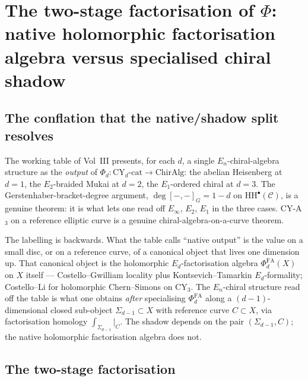 \section{The two-stage factorisation of $\Phi$: native holomorphic
factorisation algebra versus specialised chiral shadow}
\label{sec:two-stage-functor}

\subsection{The conflation that the native/shadow split resolves}

The working table of Vol~III presents, for each $d$, a single
$E_n$-chiral-algebra structure as the \emph{output} of
$\Phi_d: \mathrm{CY}_d\text{-cat}\to\mathrm{ChirAlg}$: the abelian
Heisenberg at $d=1$, the $E_2$-braided Mukai at $d=2$, the $E_1$-ordered
chiral at $d=3$. The Gerstenhaber-bracket-degree argument,
$\deg[-,-]_G = 1-d$ on $\mathrm{HH}^{\bullet}(\mathcal{C})$, is a genuine
theorem: it is what lets one read off $E_\infty$, $E_2$, $E_1$ in the
three cases. CY-A$_3$ on a reference elliptic curve is a genuine
chiral-algebra-on-a-curve theorem.

The labelling is backwards. What the table calls ``native output'' is
the value on a small disc, or on a reference curve, of a canonical
object that lives one dimension up. That canonical object is the
holomorphic $E_d$-factorisation algebra $\Phi^{\mathrm{FA}}_d(X)$ on
$X$ itself --- Costello--Gwilliam locality plus Kontsevich--Tamarkin
$E_d$-formality; Costello--Li for holomorphic Chern--Simons on CY$_3$.
The $E_n$-chiral structure read off the table is what one obtains
\emph{after} specialising $\Phi^{\mathrm{FA}}_d$ along a
$(d-1)$-dimensional closed sub-object $\Sigma_{d-1}\subset X$ with
reference curve $C\subset X$, via factorisation homology
$\int_{\Sigma_{d-1}}\big|_{C}$. The shadow depends on the pair
$(\Sigma_{d-1},C)$; the native holomorphic factorisation algebra does
not.

\subsection{The two-stage factorisation}

